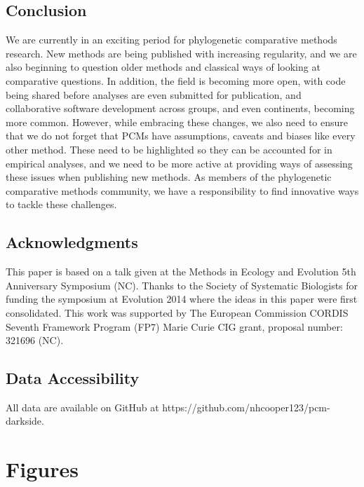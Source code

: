 \documentclass[a4paper,12pt]{article}
\begin{document}
  \subsection{Conclusion}
    We are currently in an exciting period for phylogenetic comparative methods research.
    New methods are being published with increasing regularity, and we are also beginning to question older methods and classical ways of looking at comparative questions. 
    In addition, the field is becoming more open, with code being shared before analyses are even submitted for publication, and collaborative software development across groups, and even continents, becoming more common.
    However, while embracing these changes, we also need to ensure that we do not forget that PCMs have assumptions, caveats and biases like every other method. 
    These need to be highlighted so they can be accounted for in empirical analyses, and we need to be more active at providing ways of assessing these issues when publishing new methods.
    As members of the phylogenetic comparative methods community, we have a responsibility to find innovative ways to tackle these challenges. 

  \subsection{Acknowledgments}
    This paper is based on a talk given at the Methods in Ecology and Evolution 5th Anniversary Symposium (NC).
    Thanks to the Society of Systematic Biologists for funding the symposium at Evolution 2014 where the ideas in this paper were first consolidated. 
    This work was supported by The European Commission CORDIS Seventh Framework Program (FP7) Marie Curie CIG grant, proposal number: 321696 (NC).

  \subsection{Data Accessibility}
    All data are available on GitHub at https://github.com/nhcooper123/pcm-darkside.




\newpage
\section{Figures}
\end{document}
